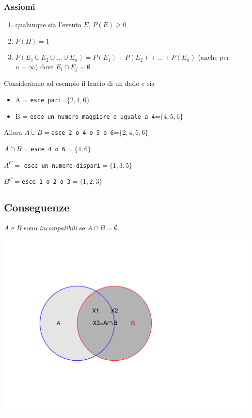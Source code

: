 \documentclass[onecolumn,12pt]{book}\usepackage[]{graphicx}\usepackage[]{color}
\makeatletter
\def\maxwidth{ %
  \ifdim\Gin@nat@width>\linewidth
    \linewidth
  \else
    \Gin@nat@width
  \fi
}
\newenvironment{knitrout}{}{} %
\makeatother
\begin{document}
\subsubsection{ Assiomi}
\begin{enumerate}
\item qualunque sia l'evento $E$, $P(E)\geq 0$
\item $P(\Omega)=1$
\item  $P(E_1\cup E_2\cup\ldots \cup E_n)=P(E_1)+P(E_2)+\ldots +P(E_n)$ (anche per $n=\infty$) dove $E_i\cap E_j=\emptyset$
\end{enumerate}

Consideriamo ad esempio il lancio di un dado e sia
\begin{itemize}
\item  A = \texttt{esce pari}=$\{2,4,6\}$
\item  B = \texttt{esce un numero maggiore o uguale a 4}=$\{4,5,6\}$
\end{itemize}


Allora
$A\cup B=$\texttt{esce 2 o 4 o 5 o 6}=$\{2,4,5,6\}$

$A\cap B=$\texttt{esce 4 o 6}$=\{4,6\}$

$A^C=$ \texttt{esce un numero dispari}$=\{1,3,5\}$

$B^C=$\texttt{esce 1 o 2 o 3}$=\{1,2,3\}$
        
        
\subsection{Conseguenze}   


   
$A$ e $B$ sono \emph{incompatibili} se $A\cap B=\emptyset$.

\begin{knitrout}
\color{fgcolor}
\includegraphics[width=\maxwidth]{figure/unnamed-chunk-4-1} 

\end{knitrout}
\end{document}
